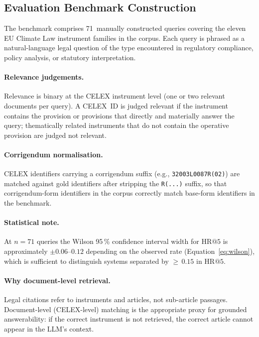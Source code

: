 \documentclass[sigconf,screen]{acmart}
\makeatletter
\newcommand{\HR}[1]{\mathrm{HR}@{#1}}
\makeatother
\begin{document}
\subsection{Evaluation Benchmark Construction}
\label{sec:eval-bench}

The benchmark comprises 71~manually constructed queries covering the
eleven EU Climate Law instrument families in the corpus.  Each query
is phrased as a natural-language legal question of the type
encountered in regulatory compliance, policy analysis, or statutory
interpretation.

\paragraph{Relevance judgements.}
Relevance is binary at the CELEX instrument level (one or two
relevant documents per query).  A CELEX~ID is judged relevant if the
instrument contains the provision or provisions that directly and
materially answer the query; thematically related instruments that do
not contain the operative provision are judged not relevant.

\paragraph{Corrigendum normalisation.}
CELEX identifiers carrying a corrigendum suffix
(e.g., \texttt{32003L0087R(02)}) are matched against gold identifiers
after stripping the \texttt{R(...)} suffix, so that corrigendum-form
identifiers in the corpus correctly match base-form identifiers in
the benchmark.

\paragraph{Statistical note.}
At $n{=}71$ queries the Wilson 95\,\% confidence interval width for
$\HR{5}$ is approximately $\pm0.06$--$0.12$ depending on the
observed rate (Equation~\ref{eq:wilson}), which is sufficient to
distinguish systems separated by ${\geq}\,0.15$ in $\HR{5}$.

\paragraph{Why document-level retrieval.}
Legal citations refer to instruments and articles, not sub-article
passages.  Document-level (CELEX-level) matching is the appropriate
proxy for grounded answerability: if the correct instrument is not
retrieved, the correct article cannot appear in the LLM's context.
\end{document}

